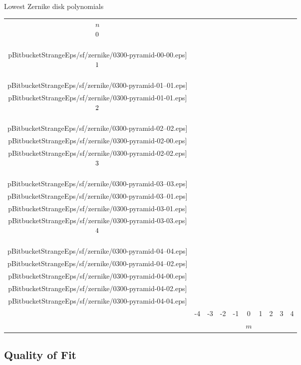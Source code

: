 \begin{frame}{Lowest Zernike disk polynomials}
    \centering
  	\setlength\extrarowheight{-6pt}
    \setlength{\tabcolsep}{3pt}       %
    \begin{tabular}{cccccccccc}
				$n$ \\
 				$\raisebox{12pt}{0}$  &
        & & & & \texttt{[image: \\pBitbucketStrangeEps/sf/zernike/0300-pyramid-00-00.eps]} & & & & \\[-4pt]
 				$\raisebox{12pt}{1}$  &
        & & & \texttt{[image: \\pBitbucketStrangeEps/sf/zernike/0300-pyramid-01--01.eps]} &
        & \texttt{[image: \\pBitbucketStrangeEps/sf/zernike/0300-pyramid-01-01.eps]} & & & \\[-4pt]
 				$\raisebox{12pt}{2}$  &
        & & \texttt{[image: \\pBitbucketStrangeEps/sf/zernike/0300-pyramid-02--02.eps]} &
        & \texttt{[image: \\pBitbucketStrangeEps/sf/zernike/0300-pyramid-02-00.eps]} &
        & \texttt{[image: \\pBitbucketStrangeEps/sf/zernike/0300-pyramid-02-02.eps]} & & \\[-4pt]
 				$\raisebox{12pt}{3}$  &
        & \texttt{[image: \\pBitbucketStrangeEps/sf/zernike/0300-pyramid-03--03.eps]} &
        & \texttt{[image: \\pBitbucketStrangeEps/sf/zernike/0300-pyramid-03--01.eps]} &
        & \texttt{[image: \\pBitbucketStrangeEps/sf/zernike/0300-pyramid-03-01.eps]} &
        & \texttt{[image: \\pBitbucketStrangeEps/sf/zernike/0300-pyramid-03-03.eps]} & \\[-4pt]
				$\raisebox{12pt}{4}$  &
        \texttt{[image: \\pBitbucketStrangeEps/sf/zernike/0300-pyramid-04--04.eps]} &
        & \texttt{[image: \\pBitbucketStrangeEps/sf/zernike/0300-pyramid-04--02.eps]} &
        & \texttt{[image: \\pBitbucketStrangeEps/sf/zernike/0300-pyramid-04-00.eps]} &
        & \texttt{[image: \\pBitbucketStrangeEps/sf/zernike/0300-pyramid-04-02.eps]} &
        & \texttt{[image: \\pBitbucketStrangeEps/sf/zernike/0300-pyramid-04-04.eps]} \\
 				& -4 & -3 & -2 & -1 & 0 & 1 & 2 & 3 & 4 \\
				&&&&& $m$
    \end{tabular}
\end{frame}


\subsection{Quality of Fit}

\endinput  %
